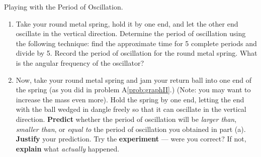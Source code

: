 \begin{aproblem}{Playing with the Period of Oscillation.}
  \begin{enumerate}
  \item Take your round metal spring, hold it by one end, and let the
    other end oscillate in the vertical direction.  Determine the
    period of oscillation using the following technique: find the
    approximate time for 5 complete periods and divide by 5.  Record
    the period of oscillation for the round metal spring.  What is the
    angular frequency of the oscillator?

  \item Now, take your round metal spring and jam your return ball
    into one end of the spring (as you did in problem
    A\ref{prob:graphII}.)  (Note: you may want to increase the mass
    even more).  Hold the spring by one end, letting the end with the
    ball wedged in dangle freely so that it can oscillate in the
    vertical direction.  {\bf Predict} whether the period of
    oscillation will be {\em larger than}, {\em smaller than}, or {\em
      equal to} the period of oscillation you obtained in part (a).
    {\bf Justify} your prediction.  Try the {\bf experiment} --- were
    you correct?  If not, {\bf explain} what {\em actually} happened.

  \end{enumerate}
  \label{prob:period}
\end{aproblem}



